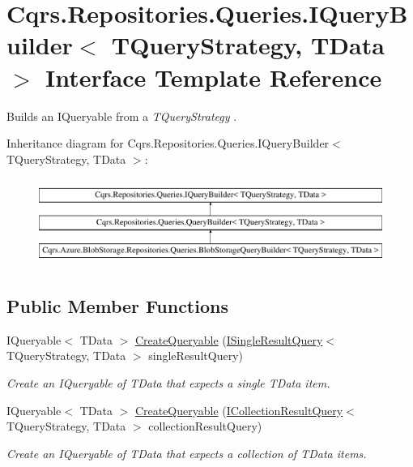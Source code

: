 \hypertarget{interfaceCqrs_1_1Repositories_1_1Queries_1_1IQueryBuilder}{}\section{Cqrs.\+Repositories.\+Queries.\+I\+Query\+Builder$<$ T\+Query\+Strategy, T\+Data $>$ Interface Template Reference}
\label{interfaceCqrs_1_1Repositories_1_1Queries_1_1IQueryBuilder}


Builds an I\+Queryable from a {\itshape T\+Query\+Strategy} .  


Inheritance diagram for Cqrs.\+Repositories.\+Queries.\+I\+Query\+Builder$<$ T\+Query\+Strategy, T\+Data $>$\+:\begin{figure}[H]
\begin{center}
\leavevmode
\includegraphics[height=2.876712cm]{interfaceCqrs_1_1Repositories_1_1Queries_1_1IQueryBuilder}
\end{center}
\end{figure}
\subsection*{Public Member Functions}
\begin{DoxyCompactItemize}
\item 
I\+Queryable$<$ T\+Data $>$ \hyperlink{interfaceCqrs_1_1Repositories_1_1Queries_1_1IQueryBuilder_a83cb87d485491c6d38fe8fa6fd649373_a83cb87d485491c6d38fe8fa6fd649373}{Create\+Queryable} (\hyperlink{interfaceCqrs_1_1Repositories_1_1Queries_1_1ISingleResultQuery}{I\+Single\+Result\+Query}$<$ T\+Query\+Strategy, T\+Data $>$ single\+Result\+Query)
\begin{DoxyCompactList}\small\item\em Create an I\+Queryable of {\itshape T\+Data}  that expects a single {\itshape T\+Data}  item. \end{DoxyCompactList}\item 
I\+Queryable$<$ T\+Data $>$ \hyperlink{interfaceCqrs_1_1Repositories_1_1Queries_1_1IQueryBuilder_ab903955b6fb1843a3e168b33252161a5_ab903955b6fb1843a3e168b33252161a5}{Create\+Queryable} (\hyperlink{interfaceCqrs_1_1Repositories_1_1Queries_1_1ICollectionResultQuery}{I\+Collection\+Result\+Query}$<$ T\+Query\+Strategy, T\+Data $>$ collection\+Result\+Query)
\begin{DoxyCompactList}\small\item\em Create an I\+Queryable of {\itshape T\+Data}  that expects a collection of {\itshape T\+Data}  items. \end{DoxyCompactList}\end{DoxyCompactItemize}


